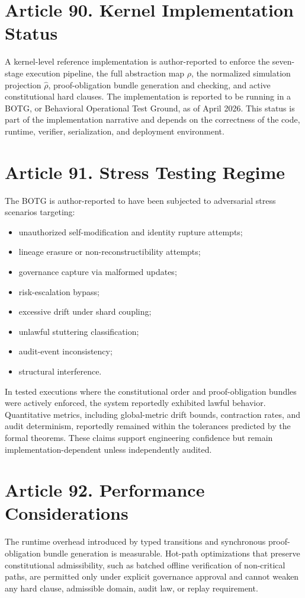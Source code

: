\documentclass[10pt,oneside]{article}
\theoremstyle{definition}
\theoremstyle{remark}
\begin{document}
\section{Article 90. Kernel Implementation Status}
A kernel-level reference implementation is author-reported to enforce the seven-stage execution pipeline, the full abstraction map \(\rho\), the normalized simulation projection \(\widehat{\rho}\), proof-obligation bundle generation and checking, and active constitutional hard clauses. The implementation is reported to be running in a BOTG, or Behavioral Operational Test Ground, as of April 2026. This status is part of the implementation narrative and depends on the correctness of the code, runtime, verifier, serialization, and deployment environment.

\section{Article 91. Stress Testing Regime}
The BOTG is author-reported to have been subjected to adversarial stress scenarios targeting:
\begin{itemize}
  \item unauthorized self-modification and identity rupture attempts;
  \item lineage erasure or non-reconstructibility attempts;
  \item governance capture via malformed updates;
  \item risk-escalation bypass;
  \item excessive drift under shard coupling;
  \item unlawful stuttering classification;
  \item audit-event inconsistency;
  \item structural interference.
\end{itemize}
In tested executions where the constitutional order and proof-obligation bundles were actively enforced, the system reportedly exhibited lawful behavior. Quantitative metrics, including global-metric drift bounds, contraction rates, and audit determinism, reportedly remained within the tolerances predicted by the formal theorems. These claims support engineering confidence but remain implementation-dependent unless independently audited.

\section{Article 92. Performance Considerations}
The runtime overhead introduced by typed transitions and synchronous proof-obligation bundle generation is measurable. Hot-path optimizations that preserve constitutional admissibility, such as batched offline verification of non-critical paths, are permitted only under explicit governance approval and cannot weaken any hard clause, admissible domain, audit law, or replay requirement.
\end{document}
